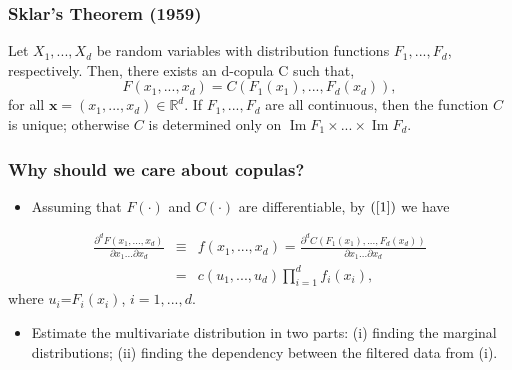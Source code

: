\documentclass[pdf,9pt,xcolor=dvipsnames,hide notes]{beamer}
\DeclareMathOperator{\Ima}{Im}
\begin{document}
		\begin{frame}[label=frame1c2]
	\frametitle{Sklar's Theorem (1959)}
	
	
\begin{theorem}
	Let $X_{1},...,X_{d}$ be random variables with distribution functions $F_{1},...,F_{d}$, respectively. Then, there exists an d-copula C such that,
	\begin{equation}
	F\left( x_{1},...,x_{d}\right) =C\left( F_{1}\left( x_{1}\right)
	,...,F_{d}\left( x_{d}\right) \right) ,  \label{1} 
	\end{equation}
\noindent for all $\mathbf{x}=\left( x_{1},...,x_{d}\right) \in
\mathbb{R}^{d}$. If $F_{1},...,F_{d}$ are all continuous, then the function $C$ is unique; otherwise $C$ is determined only on $\Ima F_{1}\times ...\times \Ima F_{d}$. 
\end{theorem}


\end{frame}

\begin{frame}[label=frame2]
\frametitle{Why should we care about copulas?}


	\begin{itemize}
		\justifying
		
		\item Assuming that $F\left( \cdot \right) $ and $C\left( \cdot
		\right) $ are differentiable, by $\left( \ref{1}\right)$ we have
		
	\end{itemize}
	
	\begin{eqnarray}
	\frac{\partial ^{d}F\left( x_{1},...,x_{d}\right) }{\partial
		x_{1}...\partial x_{d}} &\equiv &f\left( x_{1},...,x_{d}\right) =\frac{
		\partial ^{d}C\left( F_{1}\left( x_{1}\right) ,...,F_{d}\left( x_{d}\right)
		\right) }{\partial x_{1}...\partial x_{d}} \\
	&=&c\left( u_{1},...,u_{d}\right) \prod_{i=1}^{d}f_{i}\left( x_{i}\right),
	\label{23}
	\end{eqnarray}%
	where $u_{i}$=$F_{i}\left( x_{i}\right) $, $i=1,...,d$.
	
	\vspace{0.3cm}
	\pause
	
	\begin{itemize}
		\item Estimate the multivariate distribution in two parts: (i) finding the marginal distributions; (ii) finding the dependency between the filtered data from (i). 
	\end{itemize}

	
	
\end{frame}
\end{document}
